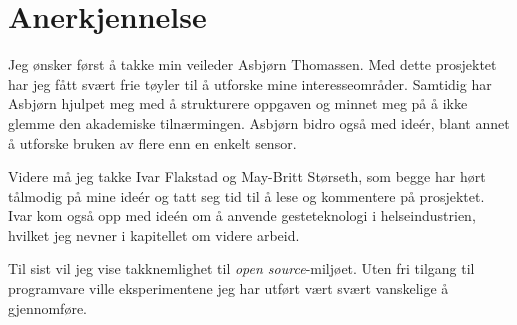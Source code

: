 \section*{Anerkjennelse}
Jeg ønsker først å takke min veileder Asbjørn Thomassen. Med dette prosjektet har jeg fått svært frie tøyler til å utforske mine interesseområder. Samtidig har Asbjørn hjulpet meg med å strukturere oppgaven og minnet meg på å ikke glemme den akademiske tilnærmingen. Asbjørn bidro også med ideér, blant annet å utforske bruken av flere enn en enkelt sensor.

Videre må jeg takke Ivar Flakstad og May-Britt Størseth, som begge har hørt tålmodig på mine ideér og tatt seg tid til å lese og kommentere på prosjektet. Ivar kom også opp med ideén om å anvende gesteteknologi i helseindustrien, hvilket jeg nevner i kapitellet om videre arbeid.

Til sist vil jeg vise takknemlighet til \emph{open source}-miljøet. Uten fri tilgang til programvare ville eksperimentene jeg har utført vært svært vanskelige å gjennomføre.